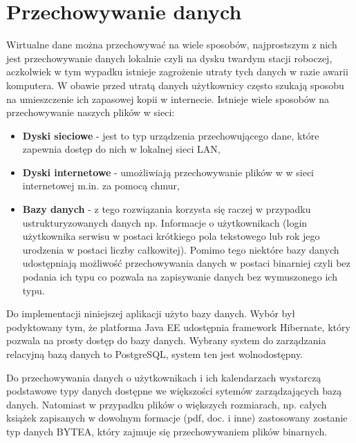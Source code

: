\section{Przechowywanie danych}
\label{sec:bazadanych}
Wirtualne dane można przechowywać na wiele sposobów, najprostszym z nich jest przechowywanie danych lokalnie czyli na dysku twardym stacji roboczej, aczkolwiek w tym wypadku istnieje zagrożenie utraty tych danych w razie awarii komputera. W obawie przed utratą danych użytkownicy często szukają sposobu na umieszczenie ich zapasowej kopii w internecie. Istnieje wiele sposobów na przechowywanie naszych plików w sieci:
\begin{itemize}
	\item \textbf{Dyski sieciowe} - jest to typ urządzenia przechowującego dane, które zapewnia dostęp do nich w lokalnej sieci LAN,
	\item \textbf{Dyski internetowe} - umożliwiają przechowywanie plików w w sieci internetowej m.in. za pomocą chmur,
	\item \textbf{Bazy danych} - z tego rozwiązania korzysta się raczej w przypadku ustrukturyzowanych danych np. Informacje o użytkownikach (login użytkownika serwisu w postaci krótkiego pola tekstowego lub rok jego urodzenia w postaci liczby całkowitej). Pomimo tego niektóre bazy danych udostępniają możliwość przechowywania danych w postaci binarniej czyli bez podania ich typu co pozwala na zapisywanie danych bez wymuszonego ich typu.  
\end{itemize}

Do implementacji niniejszej aplikacji użyto bazy danych. Wybór był podyktowany tym, że platforma Java EE udostępnia framework Hibernate, który pozwala na prosty dostęp do bazy danych. Wybrany system do zarządzania relacyjną bazą danych to PostgreSQL, system ten jest wolnodostępny. 

Do przechowywania danych o użytkownikach i ich kalendarzach wystarczą podstawowe typy danych dostępne we większości sytemów zarządzających bazą danych. Natomiast w przypadku plików o większych rozmiarach, np. całych książek zapisanych w dowolnym formacje (pdf, doc. i inne) zastosowany zostanie typ danych BYTEA, który zajmuje się przechowywaniem plików binarnych.
